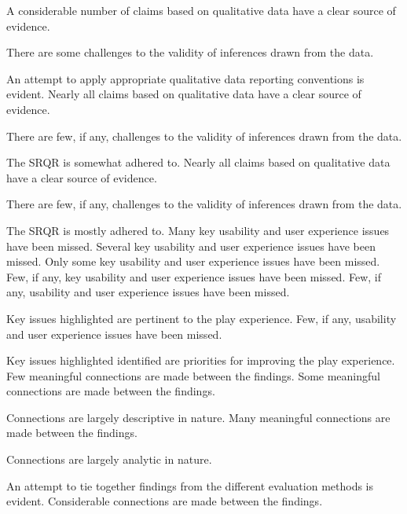 \documentclass{../../fal_assignment}
\begin{document}
\begin{markingrubric}
        \grade		A considerable number of claims based on qualitative data have a clear source of evidence.
        \par		There are some challenges to the validity of inferences drawn from the data.
        \par 		An attempt to apply appropriate qualitative data reporting conventions is evident.
        \grade		Nearly all claims based on qualitative data have a clear source of evidence.
        \par		There are few, if any, challenges to the validity of inferences drawn from the data.
        \par 		The SRQR is somewhat adhered to.
        \grade		Nearly all claims based on qualitative data have a clear source of evidence.
        \par		There are few, if any, challenges to the validity of inferences drawn from the data.
        \par		The SRQR is mostly adhered to.
%
        \grade\fail 	Many key usability and user experience issues have been missed.
        \grade		Several key usability and user experience issues have been missed.
        \grade		Only some key usability and user experience issues have been missed.
        \grade		Few, if any, key usability and user experience issues have been missed.
        \grade		Few, if any, usability and user experience issues have been missed.
        \par		Key issues highlighted are pertinent to the play experience.
        \grade		Few, if any, usability and user experience issues have been missed.
        \par		Key issues highlighted identified are priorities for improving the play experience.
%
        \grade \fail	Few meaningful connections are made between the findings.
        \grade 		Some meaningful connections are made between the findings.
        \par     		Connections are largely descriptive in nature.
        \grade		Many meaningful connections are made between the findings.
        \par     		Connections are largely analytic in nature.
        \par		An attempt to tie together findings from the different evaluation methods is evident.
        \grade		Considerable connections are made between the findings.

\end{markingrubric}
\end{document}
